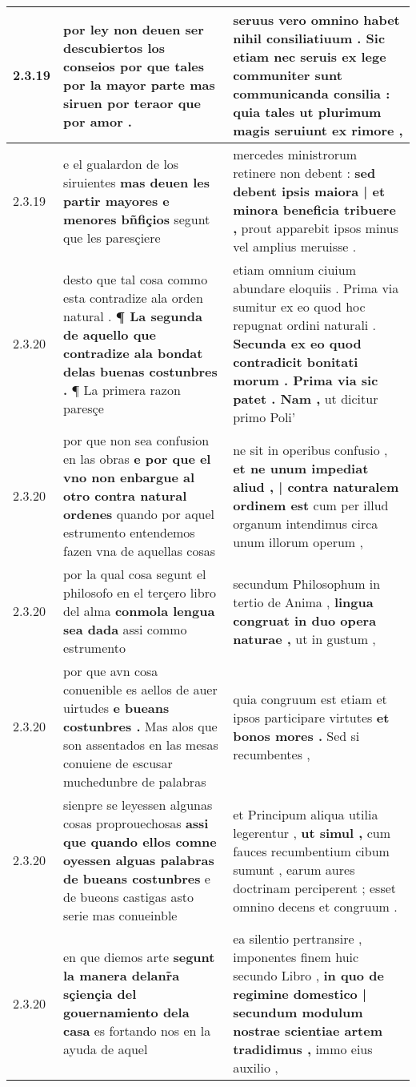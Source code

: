 \begin{tabular}{|p{1cm}|p{6.5cm}|p{6.5cm}|}
2.3.19 & por ley non deuen ser descubiertos los conseios \textbf{ por que tales por la mayor parte } mas siruen por teraor que por amor . & seruus vero omnino habet nihil consiliatiuum . Sic etiam nec seruis ex lege communiter sunt communicanda consilia : \textbf{ quia tales } ut plurimum magis seruiunt ex rimore , \\\hline
2.3.19 & e el gualardon de los siruientes \textbf{ mas deuen les partir mayores e menores bñfiçios } segunt que les paresçiere & mercedes ministrorum retinere non debent : \textbf{ sed debent ipsis maiora | et minora beneficia tribuere , } prout apparebit ipsos minus vel amplius meruisse . \\\hline
2.3.20 & desto que tal cosa commo esta contradize ala orden natural . \textbf{ ¶ La segunda de aquello que contradize ala bondat delas buenas costunbres . } ¶ La primera razon paresçe & etiam omnium ciuium abundare eloquiis . Prima via sumitur ex eo quod hoc repugnat ordini naturali . \textbf{ Secunda ex eo quod contradicit bonitati morum . Prima via sic patet . Nam , } ut dicitur primo Poli’ \\\hline
2.3.20 & por que non sea confusion en las obras \textbf{ e por que el vno non enbargue al otro contra natural ordenes } quando por aquel estrumento entendemos fazen vna de aquellas cosas & ne sit in operibus confusio , \textbf{ et ne unum impediat aliud , | contra naturalem ordinem est } cum per illud organum intendimus circa unum illorum operum , \\\hline
2.3.20 & por la qual cosa segunt el philosofo en el terçero libro del alma \textbf{ conmola lengua sea dada } assi commo estrumento & secundum Philosophum in tertio de Anima , \textbf{ lingua congruat in duo opera naturae , } ut in gustum , \\\hline
2.3.20 & por que avn cosa conuenible es aellos de auer uirtudes \textbf{ e bueans costunbres . } Mas alos que son assentados en las mesas conuiene de escusar muchedunbre de palabras & quia congruum est etiam et ipsos participare virtutes \textbf{ et bonos mores . } Sed si recumbentes , \\\hline
2.3.20 & sienpre se leyessen algunas cosas proprouechosas \textbf{ assi que quando ellos comne oyessen alguas palabras de bueans costunbres } e de bueons castigas asto serie mas conueinble & et Principum aliqua utilia legerentur , \textbf{ ut simul , } cum fauces recumbentium cibum sumunt , earum aures doctrinam perciperent ; esset omnino decens et congruum . \\\hline
2.3.20 & en que diemos arte \textbf{ segunt la manera delanr̃a sçiençia del gouernamiento dela casa } es fortando nos en la ayuda de aquel & ea silentio pertransire , imponentes finem huic secundo Libro , \textbf{ in quo de regimine domestico | secundum modulum nostrae scientiae artem tradidimus , } immo eius auxilio , \\\hline

\end{tabular}
